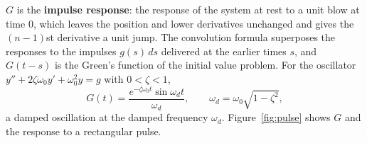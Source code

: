 \documentclass[11pt,a4paper]{article}
\numberwithin{equation}{section}
\theoremstyle{definition}
\begin{document}
$G$ is the \textbf{impulse response}: the response of the system at rest to a unit blow at time $0$, which leaves the position and lower derivatives unchanged and gives the
$(n - 1)$st derivative a unit jump. The convolution formula superposes the responses to the impulses $g(s)\,ds$ delivered at the earlier times $s$, and $G(t - s)$ is the Green's function of
the initial value problem. For the oscillator $y'' + 2\zeta\omega_0y' + \omega_0^2y = g$ with $0 < \zeta < 1$,
\[
G(t) = \frac{e^{-\zeta\omega_0t}\sin\omega_dt}{\omega_d}, \qquad \omega_d = \omega_0\sqrt{1 - \zeta^2},
\]
a damped oscillation at the damped frequency $\omega_d$. Figure~\ref{fig:pulse} shows $G$ and the response to a rectangular pulse.

\begin{figure}[H]
\centering
{}
\end{figure}
\end{document}

